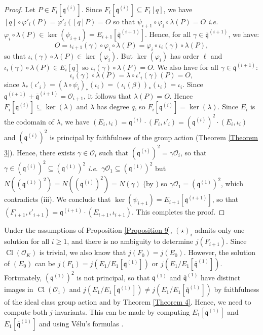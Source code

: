 \documentclass[a4paper,10pt,notitlepage]{report}
\theoremstyle{definition}
\theoremstyle{plain}
\theoremstyle{definition}
\newcommand{\ie}{\emph{i.e.}\ }
\newcommand{\mO}{\mathcal{O}}
\renewcommand{\(}{\left(}
\renewcommand{\)}{\right)}
\newcommand{\mf}[1]{\mathfrak{#1}}
\newcommand{\mfq}{\mathfrak{q}}
\DeclareMathOperator{\Cl}{Cl}
\begin{document}
\begin{proof}
Let $P\in F_i[\mfq^{(i)}]$. Since $F_i[\mfq^{(i)}]\subseteq F_i[q]$, we have $[q]\circ\varphi'_i(P)=\varphi'_i([q]P)=O$ so that $\psi_{i+1}\circ\varphi_i\circ\lambda(P)=O$ \ie  $\varphi_i\circ\lambda(P)\in\ker(\psi_{i+1})=E_{i+1}[\overline{\mfq}^{(i+1)}]$. Hence, for all $\gamma\in\overline{\mfq}^{(i+1)}$, we have:
\[O=\iota_{i+1}(\gamma)\circ\varphi_i\circ\lambda(P)=\varphi_i\circ\iota_i(\gamma)\circ\lambda(P),\]
so that $\iota_i(\gamma)\circ\lambda(P)\in \ker(\varphi_i)$. But $\ker(\varphi_i)$ has order $\ell$ and $\iota_i(\gamma)\circ\lambda(P)\in E_i[q]$ so $\iota_i(\gamma)\circ\lambda(P)=O$. We also have for all $\gamma\in\mfq^{(i+1)}$:
\[\iota_i(\gamma)\circ\lambda(P)=\lambda\circ\iota'_i(\gamma)(P)=O,\]
since $\lambda_*(\iota'_i)=(\lambda\circ\psi_i)_*(\iota_i)=(\iota_i(\beta))_*(\iota_i)=\iota_i$. Since $\mfq^{(i+1)}+\overline{\mfq}^{(i+1)}=\mO_{i+1}$, it follows that $\lambda(P)=O$. Hence $F_i[\mfq^{(i)}]\subseteq\ker(\lambda)$ and $\lambda$ has degree $q$, so $F_i[\mfq^{(i)}]=\ker(\lambda)$. Since $E_i$ is the codomain of $\lambda$, we have $(E_i,\iota_i)=\mfq^{(i)}\cdot (F_i,\iota'_i)=(\mfq^{(i)})^2\cdot (E_i,\iota_i)$ and $(\mfq^{(i)})^2$ is principal by faithfulness of the group action (Theorem \ref{Theorem 3}). Hence, there exists $\gamma\in\mO_i$ such that $(\mfq^{(i)})^2=\gamma\mO_i$, so that $\gamma\in (\mfq^{(i)})^2\subseteq (\mfq^{(1)})^2$ \ie $\gamma\mO_1\subseteq (\mfq^{(1)})^2$ but $N((\mfq^{(1)})^2)=N((\mfq^{(i)})^2)=N(\gamma)$ (by \cite[Proposition 7.20.(i)]{Cox}) so $\gamma\mO_1= (\mfq^{(1)})^2$, which contradicts (iii).  We conclude that $\ker(\psi_{i+1})=E_{i+1}[\mfq^{(i+1)}]$, so that $(F_{i+1},\iota'_{i+1})=\mf{q}^{(i+1)}\cdot(E_{i+1},\iota_{i+1})$. This completes the proof.
\end{proof}

Under the assumptions of Proposition \ref{Proposition 9},  $(\star)_i$ admits only one solution for all $i\geq 1$, and there is no ambiguity to determine $j(F_{i+1})$. Since $\Cl(\mO_K)$ is trivial, we also know that $j(F_0)=j(E_0)$. However, the solution of $(E_0)$ can be $j(F_1)=j(E_1/E_1[\mfq^{(1)}])$ or $j(E_1/E_1[\overline{\mfq}^{(1)}])$. Fortunately, $(\mfq^{(1)})^2$ is not principal, so that $\mfq^{(1)}$ and $\overline{\mfq}^{(1)}$ have distinct images in $\Cl(\mO_1)$ and $j(E_1/E_1[\mfq^{(1)}])\neq j(E_1/E_1[\overline{\mfq}^{(1)}])$ by faithfulness of the ideal class group action and by Theorem \ref{Theorem 4}.  Hence, we need to compute both $j$-invariants. This can be made by computing $E_1[\mfq^{(1)}]$ and $E_1[\overline{\mfq}^{(1)}]$ and using V\'{e}lu's formulas \cite{Velu}. 
\end{document}
